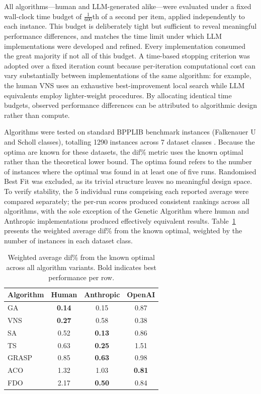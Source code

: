 \documentclass[11pt]{article}
\begin{document}
All algorithms---human and LLM-generated alike---were evaluated under a fixed wall-clock time budget of $\frac{1}{600}$th of a second per item, applied independently to each instance. This budget is deliberately tight but sufficient to reveal meaningful performance differences, and matches the time limit under which LLM implementations were developed and refined. Every implementation consumed the great majority if not all of this budget. A time-based stopping criterion was adopted over a fixed iteration count because per-iteration computational cost can vary substantially between implementations of the same algorithm: for example, the human VNS uses an exhaustive best-improvement local search while LLM equivalents employ lighter-weight procedures. By allocating identical time budgets, observed performance differences can be attributed to algorithmic design rather than compute.

Algorithms were tested on standard BPPLIB benchmark instances (Falkenauer U and Scholl classes), totalling 1290 instances across 7 dataset classes \cite{BPPLIB}. Because the optima are known for these datasets, the dif\% metric uses the known optimal rather than the theoretical lower bound. The optima found refers to the number of instances where the optimal was found in at least one of five runs. Randomised Best Fit was excluded, as its trivial structure leaves no meaningful design space. To verify stability, the 5 individual runs comprising each reported average were compared separately; the per-run scores produced consistent rankings across all algorithms, with the sole exception of the Genetic Algorithm where human and Anthropic implementations produced effectively equivalent results. Table~\ref{tab:summary-comparison} presents the weighted average dif\% from the known optimal, weighted by the number of instances in each dataset class.

\begin{table}[H]
\centering
\caption{Weighted average dif\% from the known optimal across all algorithm variants. Bold indicates best performance per row.}
\label{tab:summary-comparison}
\begin{tabular}{l ccc}
\toprule
Algorithm & Human & Anthropic & OpenAI \\
\midrule
GA   & \textbf{0.14} & 0.15 & 0.87 \\
VNS   & \textbf{0.27} & 0.58 & 0.38 \\
SA    & 0.52          & \textbf{0.13} & 0.86 \\
TS    & 0.63          & \textbf{0.25} & 1.51 \\
GRASP & 0.85          & \textbf{0.63} & 0.98 \\
ACO   & 1.32          & 1.03 & \textbf{0.81} \\
FDO   & 2.17          & \textbf{0.50} & 0.84 \\
\bottomrule
\end{tabular}
\end{table}
\end{document}
